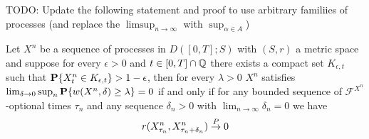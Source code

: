 TODO: Update the following statement and proof to use arbitrary familiies of processes (and replace the $\limsup_{n \to \infty}$ with $\sup_{\alpha \in A}$)
\begin{thm}\label{SkorohodInfiniteAldousCriterion}Let $X^n$ be a sequence of processes in $D([0,T];S)$ with $(S,r)$ a metric space and suppose for every $\epsilon > 0$ and $t \in [0,T] \cap \mathbb{Q}$ there exists a compact set $K_{\epsilon,t}$ such that $\textbf{P}\{X^n_t \in K_{\epsilon,t}\} > 1 - \epsilon$, then for every $\lambda > 0$ $X^n$ satisfies $\lim_{\delta \to 0} \sup_n \textbf{P}\{w(X^n, \delta) \geq \lambda\} =0$ if and only if for any bounded sequence of $\mathcal{F}^{X^n}$-optional times $\tau_n$ and any sequence $\delta_n > 0$ with $\lim_{n \to \infty} \delta_n =0$ we have
\begin{align*}
r(X^n_{\tau_n}, X^n_{\tau_n + \delta_n}) \overset{P}\to 0
\end{align*}
\end{thm}
